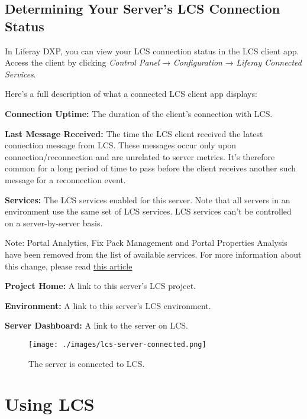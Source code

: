 \noindent\hrulefill

\section{Determining Your Server's LCS Connection
Status}\label{determining-your-servers-lcs-connection-status}

In Liferay DXP, you can view your LCS connection status in the LCS
client app. Access the client by clicking \emph{Control Panel} →
\emph{Configuration} → \emph{Liferay Connected Services}.

Here's a full description of what a connected LCS client app displays:

\textbf{Connection Uptime:} The duration of the client's connection with
LCS.

\textbf{Last Message Received:} The time the LCS client received the
latest connection message from LCS. These messages occur only upon
connection/reconnection and are unrelated to server metrics. It's
therefore common for a long period of time to pass before the client
receives another such message for a reconnection event.

\textbf{Services:} The LCS services enabled for this server. Note that
all servers in an environment use the same set of LCS services. LCS
services can't be controlled on a server-by-server basis.

Note: Portal Analytics, Fix Pack Management and Portal Properties
Analysis have been removed from the list of available services. For more
information about this change, please read
\href{https://help.liferay.com/hc/en-us/articles/360037317691-Liferay-Connected-Services-Feature-Deprecation-Update-March-2020}{this
article}

\textbf{Project Home:} A link to this server's LCS project.

\textbf{Environment:} A link to this server's LCS environment.

\textbf{Server Dashboard:} A link to the server on LCS.

\begin{figure}
\centering
\texttt{[image: ./images/lcs-server-connected.png]}
\caption{The server is connected to LCS.}
\end{figure}

\chapter{Using LCS}\label{using-lcs}

